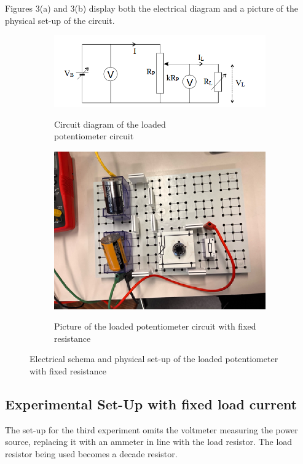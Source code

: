 \documentclass[a4paper]{article}
\begin{document}
Figures 3(a) and 3(b) display both the electrical diagram and a picture of the
physical set-up of the circuit.
\begin{figure}[!ht]
    \centering
    \begin{subfigure}{0.5\textwidth}
        \centering
        \includegraphics[width = \linewidth]{loaded pot fixed circuit.png}
        \label{fig:3a}
        \caption{Circuit diagram of the loaded \\potentiometer circuit}
    \end{subfigure}%
    \begin{subfigure}{0.5\textwidth}
        \centering
        \includegraphics[width = 0.8\linewidth]{loaded pot fixed pic.png}
        \label{fig:3b}
        \caption{Picture of the loaded potentiometer circuit with fixed resistance}        
    \end{subfigure}
    \caption{Electrical schema and physical set-up of the loaded potentiometer with fixed resistance}
\end{figure}
\newpage
\subsection{Experimental Set-Up with fixed load current}
The set-up for the third experiment omits the voltmeter measuring the power
source, replacing it with an ammeter in line with the load resistor. The load
resistor being used becomes a decade resistor.
\end{document}
